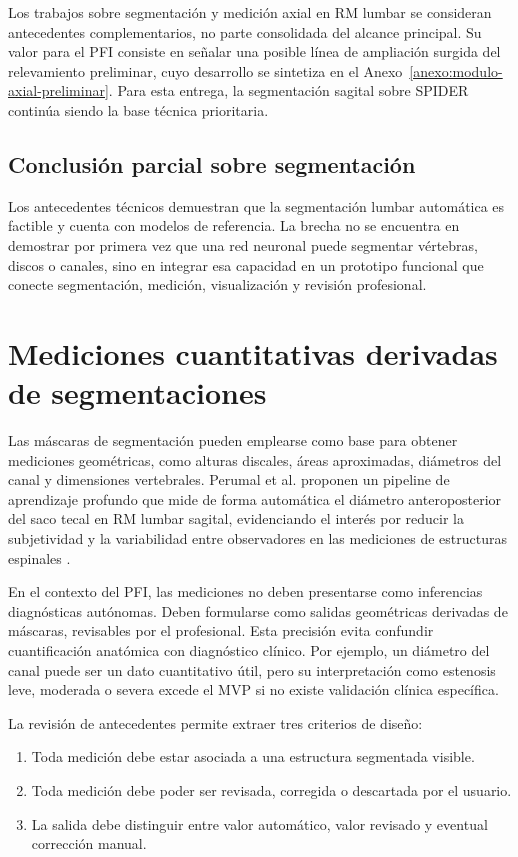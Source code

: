 Los trabajos sobre segmentación y medición axial en RM lumbar se consideran antecedentes complementarios, no parte consolidada del alcance principal. Su valor para el PFI consiste en señalar una posible línea de ampliación surgida del relevamiento preliminar, cuyo desarrollo se sintetiza en el Anexo~\ref{anexo:modulo-axial-preliminar}. Para esta entrega, la segmentación sagital sobre SPIDER continúa siendo la base técnica prioritaria.

\subsection{Conclusión parcial sobre segmentación}

Los antecedentes técnicos demuestran que la segmentación lumbar automática es factible y cuenta con modelos de referencia. La brecha no se encuentra en demostrar por primera vez que una red neuronal puede segmentar vértebras, discos o canales, sino en integrar esa capacidad en un prototipo funcional que conecte segmentación, medición, visualización y revisión profesional.

\section{Mediciones cuantitativas derivadas de segmentaciones}

Las máscaras de segmentación pueden emplearse como base para obtener mediciones geométricas, como alturas discales, áreas aproximadas, diámetros del canal y dimensiones vertebrales. Perumal et al. proponen un pipeline de aprendizaje profundo que mide de forma automática el diámetro anteroposterior del saco tecal en RM lumbar sagital, evidenciando el interés por reducir la subjetividad y la variabilidad entre observadores en las mediciones de estructuras espinales \parencite{perumal_thecal_sac_2026}.

En el contexto del PFI, las mediciones no deben presentarse como inferencias diagnósticas autónomas. Deben formularse como salidas geométricas derivadas de máscaras, revisables por el profesional. Esta precisión evita confundir cuantificación anatómica con diagnóstico clínico. Por ejemplo, un diámetro del canal puede ser un dato cuantitativo útil, pero su interpretación como estenosis leve, moderada o severa excede el MVP si no existe validación clínica específica.

La revisión de antecedentes permite extraer tres criterios de diseño:

\begin{enumerate}
    \item Toda medición debe estar asociada a una estructura segmentada visible.
    \item Toda medición debe poder ser revisada, corregida o descartada por el usuario.
    \item La salida debe distinguir entre valor automático, valor revisado y eventual corrección manual.
\end{enumerate}

